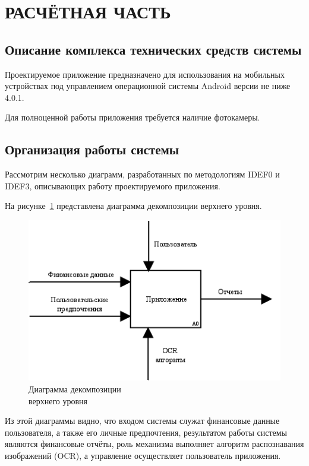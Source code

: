 \section[Расчётная часть]{РАСЧЁТНАЯ ЧАСТЬ}

\subsection{Описание комплекса технических средств системы}

Проектируемое приложение предназначено для использования
на мобильных устройствах под управлением операционной системы Android
версии не ниже 4.0.1.

Для полноценной работы приложения требуется наличие фотокамеры.

\subsection{Организация работы системы}

Рассмотрим несколько диаграмм, разработанных по методологиям IDEF0 и IDEF3,
описывающих работу проектируемого приложения.

На рисунке~\ref{fig:idef0_main} представлена диаграмма декомпозиции
верхнего уровня.

\begin{figure}[h!]
  \centering
  \includegraphics[width=130mm]{pic/idef0_main}
  \caption{Диаграмма декомпозиции \\ верхнего уровня}
  \label{fig:idef0_main}
\end{figure}

Из этой диаграммы видно, что входом системы служат финансовые данные пользователя,
а также его личные предпочтения,
результатом работы системы являются финансовые отчёты,
роль механизма выполняет алгоритм распознавания изображений (OCR),
а управление осуществляет пользователь приложения.


